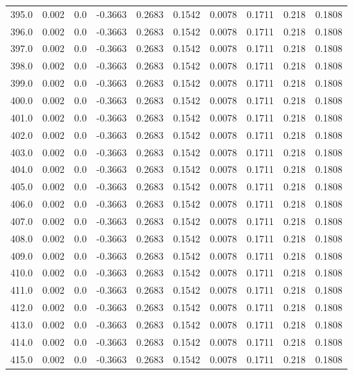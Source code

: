 \begin{longtable}{lrrrrrrrrr}
395.0 & 0.002 & 0.0 & -0.3663 & 0.2683 & 0.1542 & 0.0078 & 0.1711 & 0.218 & 0.1808 \\
396.0 & 0.002 & 0.0 & -0.3663 & 0.2683 & 0.1542 & 0.0078 & 0.1711 & 0.218 & 0.1808 \\
397.0 & 0.002 & 0.0 & -0.3663 & 0.2683 & 0.1542 & 0.0078 & 0.1711 & 0.218 & 0.1808 \\
398.0 & 0.002 & 0.0 & -0.3663 & 0.2683 & 0.1542 & 0.0078 & 0.1711 & 0.218 & 0.1808 \\
399.0 & 0.002 & 0.0 & -0.3663 & 0.2683 & 0.1542 & 0.0078 & 0.1711 & 0.218 & 0.1808 \\
400.0 & 0.002 & 0.0 & -0.3663 & 0.2683 & 0.1542 & 0.0078 & 0.1711 & 0.218 & 0.1808 \\
401.0 & 0.002 & 0.0 & -0.3663 & 0.2683 & 0.1542 & 0.0078 & 0.1711 & 0.218 & 0.1808 \\
402.0 & 0.002 & 0.0 & -0.3663 & 0.2683 & 0.1542 & 0.0078 & 0.1711 & 0.218 & 0.1808 \\
403.0 & 0.002 & 0.0 & -0.3663 & 0.2683 & 0.1542 & 0.0078 & 0.1711 & 0.218 & 0.1808 \\
404.0 & 0.002 & 0.0 & -0.3663 & 0.2683 & 0.1542 & 0.0078 & 0.1711 & 0.218 & 0.1808 \\
405.0 & 0.002 & 0.0 & -0.3663 & 0.2683 & 0.1542 & 0.0078 & 0.1711 & 0.218 & 0.1808 \\
406.0 & 0.002 & 0.0 & -0.3663 & 0.2683 & 0.1542 & 0.0078 & 0.1711 & 0.218 & 0.1808 \\
407.0 & 0.002 & 0.0 & -0.3663 & 0.2683 & 0.1542 & 0.0078 & 0.1711 & 0.218 & 0.1808 \\
408.0 & 0.002 & 0.0 & -0.3663 & 0.2683 & 0.1542 & 0.0078 & 0.1711 & 0.218 & 0.1808 \\
409.0 & 0.002 & 0.0 & -0.3663 & 0.2683 & 0.1542 & 0.0078 & 0.1711 & 0.218 & 0.1808 \\
410.0 & 0.002 & 0.0 & -0.3663 & 0.2683 & 0.1542 & 0.0078 & 0.1711 & 0.218 & 0.1808 \\
411.0 & 0.002 & 0.0 & -0.3663 & 0.2683 & 0.1542 & 0.0078 & 0.1711 & 0.218 & 0.1808 \\
412.0 & 0.002 & 0.0 & -0.3663 & 0.2683 & 0.1542 & 0.0078 & 0.1711 & 0.218 & 0.1808 \\
413.0 & 0.002 & 0.0 & -0.3663 & 0.2683 & 0.1542 & 0.0078 & 0.1711 & 0.218 & 0.1808 \\
414.0 & 0.002 & 0.0 & -0.3663 & 0.2683 & 0.1542 & 0.0078 & 0.1711 & 0.218 & 0.1808 \\
415.0 & 0.002 & 0.0 & -0.3663 & 0.2683 & 0.1542 & 0.0078 & 0.1711 & 0.218 & 0.1808 \\

\end{longtable}

